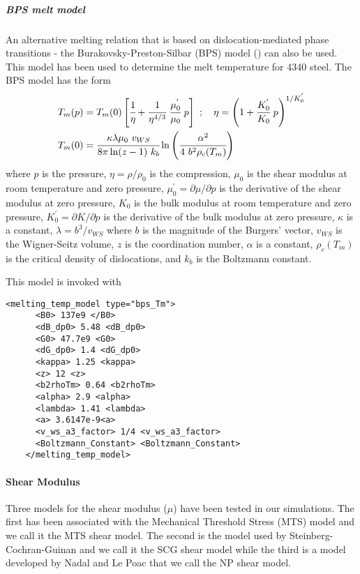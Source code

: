   \subparagraph{BPS melt model}
  An alternative melting relation that is based on dislocation-mediated
  phase transitions - the Burakovsky-Preston-Silbar (BPS) model
  (\cite{Burakovsky00}) can also be used.  This model has been used to
  determine the melt temperature for 4340 steel.  The BPS model has the form
  \begin{align}
    T_m(p) & = T_m(0)
      \left[\cfrac{1}{\eta} + 
            \cfrac{1}{\eta^{4/3}}~\cfrac{\mu_0^{'}}{\mu_0}~p\right]~; 
    \quad
    \eta = \left(1 + \cfrac{K_0^{'}}{K_0}~p\right)^{1/K_0^{'}} 
    \label{eq:TmBPS}\\
    T_m(0) & = \cfrac{\kappa\lambda\mu_0~v_{WS}}{8\pi\ln(z-1)~k_b}
               \ln\left(\cfrac{\alpha^2}{4~b^2\rho_c(T_m)}\right)
  \end{align}
  where $p$ is the pressure, $\eta = \rho/\rho_0$ is the compression,
  $\mu_0$ is the shear modulus at room temperature and zero pressure,
  $\mu_0^{'} = \partial\mu/\partial p$ is the derivative of the shear modulus
  at zero pressure, $K_0$ is the bulk modulus at room temperature and
  zero pressure, $K_0^{'} = \partial K/\partial p$ is the derivative of the
  bulk modulus at zero pressure, $\kappa$ is a constant, $\lambda = b^3/v_{WS}$
  where $b$ is the magnitude of the Burgers' vector, $v_{WS}$ is the
  Wigner-Seitz volume, $z$ is the coordination number, $\alpha$ is a
  constant, $\rho_c(T_m)$ is the critical density of dislocations, and
  $k_b$ is the Boltzmann constant.

  This model is invoked with
  \begin{Verbatim}[fontsize=\footnotesize]
    <melting_temp_model type="bps_Tm">
      <B0> 137e9 </B0>
      <dB_dp0> 5.48 <dB_dp0>
      <G0> 47.7e9 <G0>
      <dG_dp0> 1.4 <dG_dp0>
      <kappa> 1.25 <kappa>
      <z> 12 <z>
      <b2rhoTm> 0.64 <b2rhoTm>
      <alpha> 2.9 <alpha>
      <lambda> 1.41 <lambda>
      <a> 3.6147e-9<a>
      <v_ws_a3_factor> 1/4 <v_ws_a3_factor>
      <Boltzmann_Constant> <Boltzmann_Constant>
    </melting_temp_model>
  \end{Verbatim}

  \paragraph{Shear Modulus} \label{sec:ModelShear}
  Three models for the shear modulus ($\mu$) have been tested in our
  simulations.  The first has been associated with the Mechanical
  Threshold Stress (MTS) model and we call it the MTS shear model.
  The second is the model used by Steinberg-Cochran-Guinan and we call
  it the SCG shear model while the third is a model developed by
  Nadal and Le Poac that we call the NP shear model.


